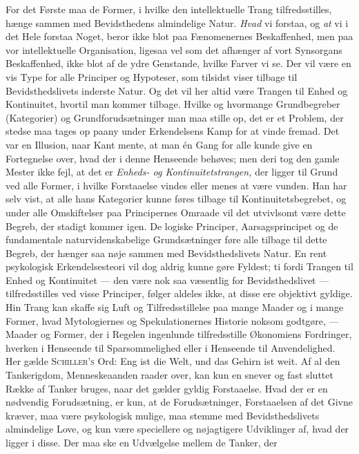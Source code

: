 \documentclass[12pt,a4paper,openany]{book}
\newcommand{\opage}[1]{\marginnote{\footnotesize\textit{[#1]}}}
\begin{document}
For det Første maa de Former, i hvilke den intellektuelle Trang
tilfredsstilles, hænge sammen med Bevidsthedens almindelige Natur.
\textit{Hvad} vi forstaa, og \textit{at} vi i det Hele forstaa Noget, beror
ikke blot paa Fænomenernes Beskaffenhed, men paa vor intellektuelle
Organisation, ligesaa vel som det afhænger af vort Synsorgans Beskaffenhed,
ikke blot af de ydre Genstande, hvilke Farver vi se. Der vil være en vis Type
for alle Principer og Hypoteser, som tilsidst viser tilbage til
Bevidsthedslivets inderste Natur. Og det vil her altid være Trangen til Enhed
og Kontinuitet, hvortil man kommer tilbage. Hvilke og hvormange Grundbegreber
(Kategorier) og Grundforudsætninger man maa stille op, det er et Problem, der
stedse maa tages op paany under Erkendelsens Kamp for at vinde fremad. Det var
en Illusion, naar Kant mente, at man én Gang for alle kunde give en Fortegnelse
over, hvad der i denne Henseende behøves; men deri tog den gamle Mester ikke
fejl, at det er \textit{Enheds- og Kontinuitetstrangen,} der ligger til Grund
ved alle Former, i hvilke Forstaaelse vindes eller menes at være vunden. Han
har selv vist, at alle hans Kategorier kunne føres tilbage til
Kontinuitetsbegrebet, og under alle Omskiftelser paa Principernes Omraade vil
det utvivlsomt være dette Begreb, der stadigt kommer igen. De logiske
Principer, Aarsagsprincipet og de fundamentale naturvidenskabelige
Grundsætninger føre alle tilbage til dette Begreb, der hænger saa nøje sammen
med Bevidsthedslivets Natur. En
\opage{35}rent psykologisk Erkendelsesteori vil dog aldrig kunne gøre Fyldest;
ti fordi Trangen til Enhed og Kontinuitet --- den være nok saa væsentlig for
Bevidsthedslivet --- tilfredsstilles ved visse Principer, følger aldeles ikke,
at disse ere objektivt gyldige. Hin Trang kan skaffe sig Luft og
Tilfredsstillelse paa mange Maader og i mange Former, hvad Mytologiernes og
Spekulationernes Historie noksom godtgøre, --- Maader og Former, der i Regelen
ingenlunde tilfredsstille Økonomiens Fordringer, hverken i Henseende til
Sparsommelighed eller i Henseende til Anvendelighed. Her gælde
\textsc{Schiller's} Ord: Eng ist die Welt, und das Gehirn ist weit. Af al den
Tankerigdom, Menneskeaanden raader over, kan kun en snever og fast sluttet
Række af Tanker bruges, naar det gælder gyldig Forstaaelse. Hvad der er en
nødvendig Forudsætning, er kun, at de Forudsætninger, Forstaaelsen af det Givne
kræver, maa være psykologisk mulige, maa stemme med Bevidsthedslivets
almindelige Love, og kun være speciellere og nøjagtigere Udviklinger af, hvad
der ligger i disse. Der maa ske en Udvælgelse mellem de Tanker, der
\end{document}
